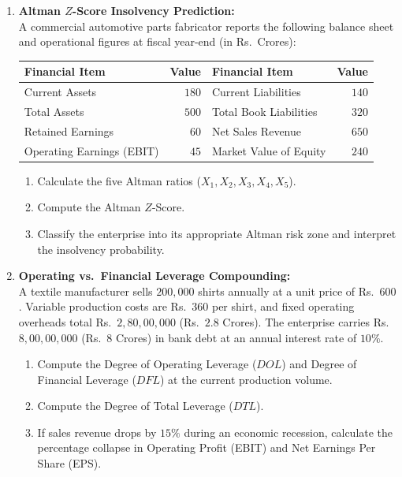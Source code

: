 \begin{enumerate}[label=\textbf{P7.\arabic*}]
    \item \textbf{Altman $Z$-Score Insolvency Prediction:}\\
    A commercial automotive parts fabricator reports the following balance sheet and operational figures at fiscal year-end (in Rs.~Crores):
    \begin{center}
    \begin{tabular}{lr|lr}
    \toprule
    \textbf{Financial Item} & \textbf{Value} & \textbf{Financial Item} & \textbf{Value} \\
    \midrule
    Current Assets & $180$ & Current Liabilities & $140$ \\
    Total Assets & $500$ & Total Book Liabilities & $320$ \\
    Retained Earnings & $60$ & Net Sales Revenue & $650$ \\
    Operating Earnings (EBIT) & $45$ & Market Value of Equity & $240$ \\
    \bottomrule
    \end{tabular}
    \end{center}
    \begin{enumerate}[label=(\alph*)]
        \item Calculate the five Altman ratios ($X_1, X_2, X_3, X_4, X_5$).
        \item Compute the Altman $Z$-Score.
        \item Classify the enterprise into its appropriate Altman risk zone and interpret the insolvency probability.
    \end{enumerate}

    \item \textbf{Operating vs.~Financial Leverage Compounding:}\\
    A textile manufacturer sells $200{,}000$ shirts annually at a unit price of Rs.~$600$. Variable production costs are Rs.~$360$ per shirt, and fixed operating overheads total Rs.~$2{,}80{,}00{,}000$ (Rs.~$2.8$ Crores). The enterprise carries Rs.~$8{,}00{,}00{,}000$ (Rs.~$8$ Crores) in bank debt at an annual interest rate of $10\%$.
    \begin{enumerate}[label=(\alph*)]
        \item Compute the Degree of Operating Leverage ($DOL$) and Degree of Financial Leverage ($DFL$) at the current production volume.
        \item Compute the Degree of Total Leverage ($DTL$).
        \item If sales revenue drops by $15\%$ during an economic recession, calculate the percentage collapse in Operating Profit (EBIT) and Net Earnings Per Share (EPS).
    \end{enumerate}


\end{enumerate}
